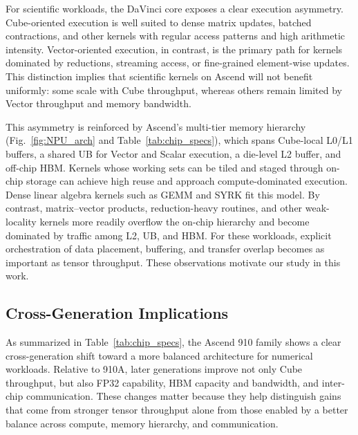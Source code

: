 \documentclass{article}
\begin{document}
For scientific workloads, the DaVinci core exposes a clear execution asymmetry. Cube-oriented execution is well suited to dense matrix updates, batched contractions, and other kernels with regular access patterns and high arithmetic intensity. Vector-oriented execution, in contrast, is the primary path for kernels dominated by reductions, streaming access, or fine-grained element-wise updates. This distinction implies that scientific kernels on Ascend will not benefit uniformly: some scale with Cube throughput, whereas others remain limited by Vector throughput and memory bandwidth.

This asymmetry is reinforced by Ascend’s multi-tier memory hierarchy (Fig.~\ref{fig:NPU_arch} and Table~\ref{tab:chip_specs}), which spans Cube-local L0/L1 buffers, a shared UB for Vector and Scalar execution, a die-level L2 buffer, and off-chip HBM. Kernels whose working sets can be tiled and staged through on-chip storage can achieve high reuse and approach compute-dominated execution. Dense linear algebra kernels such as GEMM and SYRK fit this model. By contrast, matrix--vector products, reduction-heavy routines, and other weak-locality kernels more readily overflow the on-chip hierarchy and become dominated by traffic among L2, UB, and HBM. For these workloads, explicit orchestration of data placement, buffering, and transfer overlap becomes as important as tensor throughput. These observations motivate our study in this work.



\subsection{Cross-Generation Implications}

As summarized in Table~\ref{tab:chip_specs}, the Ascend 910 family shows a clear cross-generation shift toward a more balanced architecture for numerical workloads. Relative to 910A, later generations improve not only Cube throughput, but also FP32 capability, HBM capacity and bandwidth, and inter-chip communication. These changes matter because they help distinguish gains that come from stronger tensor throughput alone from those enabled by a better balance across compute, memory hierarchy, and communication.
\end{document}
